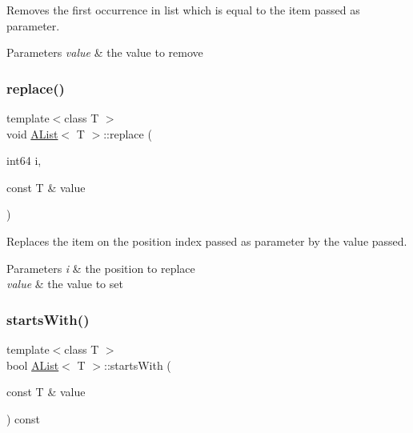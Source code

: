 Removes the first occurrence in list which is equal to the item passed as parameter. 


\begin{DoxyParams}{Parameters}
{\em value} & the value to remove \\
\hline
\end{DoxyParams}
\mbox{\label{class_a_list_a89447e683414a53f0dd0ac081c3c3f12}} 
\subsubsection{\texorpdfstring{replace()}{replace()}}
{\footnotesize\ttfamily template$<$class T $>$ \\
void \mbox{\hyperlink{class_a_list}{A\+List}}$<$ T $>$\+::replace (\begin{DoxyParamCaption}\item[{int64}]{i,  }\item[{const T \&}]{value }\end{DoxyParamCaption})}



Replaces the item on the position index passed as parameter by the value passed. 


\begin{DoxyParams}{Parameters}
{\em i} & the position to replace \\
\hline
{\em value} & the value to set \\
\hline
\end{DoxyParams}
\mbox{\label{class_a_list_ac6b1d6dabb7177aa465019860aeacba1}} 
\subsubsection{\texorpdfstring{startsWith()}{startsWith()}}
{\footnotesize\ttfamily template$<$class T $>$ \\
bool \mbox{\hyperlink{class_a_list}{A\+List}}$<$ T $>$\+::starts\+With (\begin{DoxyParamCaption}\item[{const T \&}]{value }\end{DoxyParamCaption}) const}



